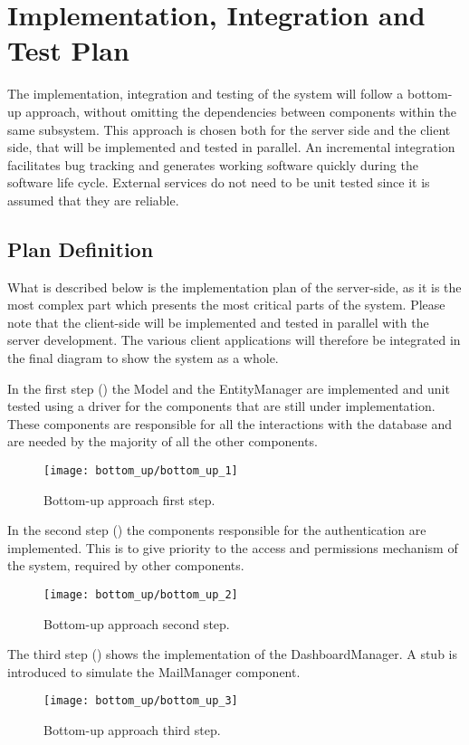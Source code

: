 \chapter{Implementation, Integration and Test Plan}
The implementation, integration and testing of the system will follow a bottom-up approach, without omitting the dependencies between components within the same subsystem. This approach is chosen both for the server side and the client side, that will be implemented and tested in parallel. An incremental integration facilitates bug tracking and generates working software quickly during the software life cycle.\newline
External services do not need to be unit tested since it is assumed that they are reliable.

\section{Plan Definition}
What is described below is the implementation plan of the server-side, as it is the most complex part which presents the most critical parts of the system.\newline
Please note that the client-side will be implemented and tested in parallel with the server development. The various client applications will therefore be integrated in the final diagram to show the system as a whole.

In the first step () the Model and the EntityManager are implemented and unit tested using a driver for the components that are still under implementation. These components are responsible for all the interactions with the database and are needed by the majority of all the other components.
\begin{figure}[H]
	\centering
	\texttt{[image: bottom\_up/bottom\_up\_1]}
	\caption{Bottom-up approach first step.}
	\label{fig:bottom_up_1}
\end{figure}

In the second step () the components responsible for the authentication are implemented. This is to give priority to the access and permissions mechanism of the system, required by other components.
\begin{figure}[H]
	\centering
	\texttt{[image: bottom\_up/bottom\_up\_2]}
	\caption{Bottom-up approach second step.}
	\label{fig:bottom_up_2}
\end{figure}


The third step () shows the implementation of the DashboardManager. A stub is introduced to simulate the MailManager component.
\begin{figure}[H]
	\centering
	\texttt{[image: bottom\_up/bottom\_up\_3]}
	\caption{Bottom-up approach third step.}
	\label{fig:bottom_up_3}
\end{figure}

